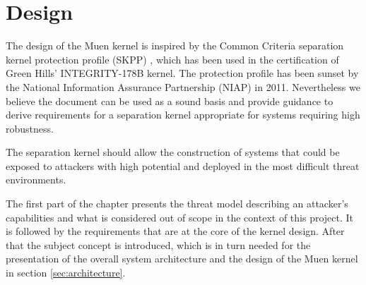\chapter{Design}\label{chap:design}
The design of the Muen kernel is inspired by the Common Criteria separation
kernel protection profile (SKPP) \cite{SKPP}, which has been used in the
certification of Green Hills' INTEGRITY-178B kernel. The protection profile has
been sunset by the National Information Assurance Partnership (NIAP) in 2011.
Nevertheless we believe the document can be used as a sound basis and provide
guidance to derive requirements for a separation kernel appropriate for systems
requiring high robustness.

The separation kernel should allow the construction of systems that could be
exposed to attackers with high potential and deployed in the most difficult
threat environments.

The first part of the chapter presents the threat model describing an
attacker's capabilities and what is considered out of scope in the context of
this project. It is followed by the requirements that are at the core of the
kernel design. After that the subject concept is introduced, which is in turn
needed for the presentation of the overall system architecture and the design
of the Muen kernel in section \ref{sec:architecture}.





